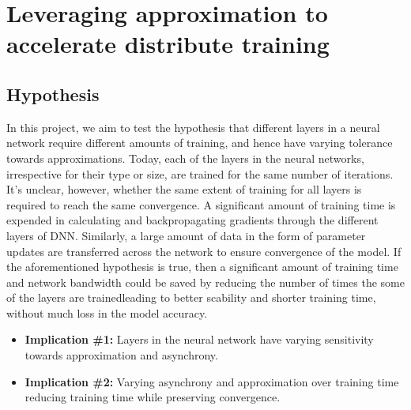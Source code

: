 \section{Leveraging approximation to accelerate distribute training}
\subsection{Hypothesis}
In this project, we aim to test the hypothesis that different layers in a neural network require different amounts of training, and hence have varying tolerance towards approximations. Today, each of the layers in the neural networks, irrespective for their type or size, are trained for the same number of iterations. It's unclear, however, whether the same extent of training for all layers is required to reach the same convergence. A significant amount of training time is expended in calculating and backpropagating gradients through the different layers of DNN. Similarly, a large amount of data in the form of parameter updates are transferred across the network to ensure convergence of the model. If the aforementioned hypothesis is true, then a significant amount of training time and network bandwidth could be saved by reducing the number of times the some of the layers are trained{\textemdash}leading to better scability and shorter training time, without much loss in the model accuracy.  

\begin{itemize}
\item \textbf{Implication \#1:} Layers in the neural network have varying sensitivity towards approximation and asynchrony.
\item \textbf{Implication \#2:} Varying asynchrony and approximation over training time reducing training time while preserving convergence.
\end{itemize}
